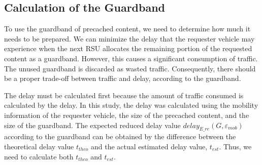 \documentclass[electronics,aricle,accept,pdftex,moreauthors]{Definitions/mdpi}
\begin{document}
\subsection{Calculation of the Guardband} \label{sec4.3}
To use the guardband of precached content, we need to determine how much it needs to be prepared. We can minimize the delay that the requester vehicle may experience when the next RSU allocates the remaining portion of the requested content as a guardband. However, this causes a significant consumption of traffic. The unused guardband is discarded as wasted traffic. Consequently, there should be a proper trade-off between traffic and delay, according to the guardband.

The delay must be calculated first because the amount of traffic consumed is calculated by the delay. In this study, the delay was calculated using the mobility information of the requester vehicle, the size of the precached content, and the size of the guardband. The expected reduced delay value $delay_{E\_re}(G, \varepsilon_{mob})$ according to the guardband can be obtained by the difference between the theoretical delay value ${t}_{theo}$ and the actual estimated delay value, ${t}_{est}$. Thus, we need to calculate both ${t}_{theo}$ and ${t}_{est}$.
\end{document}
